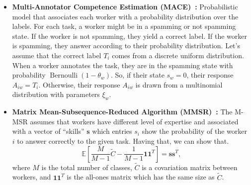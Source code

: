 \begin{itemize}
    \item \textbf{Multi-Annotator Competence Estimation (MACE)~\cite{hovy_MACE_2013}:}
    Probabilistic model that associates each worker with a probability distribution over the labels. For each task, a worker might be in a spamming or not spamming state. If the worker is not spamming, they yield a correct label. If the worker is spamming, they answer according to their probability distribution. Let's assume that the correct label $T_i$ comes from a discrete uniform distribution. When a worker annotates the task, they are in the spamming state with probability $\operatorname{Bernoulli}(1 - \theta_w)$. So, if their state $s_w = 0$, their response $A_{iw} = T_i$. Otherwise, their response $A_{iw}$ is drawn from a multinomial distribution with parameters $\xi_w$.
    \item \textbf{Matrix Mean-Subsequence-Reduced Algorithm (MMSR)~\cite{ma_Adversarial_2020}:} The M-MSR assumes that workers have different level of expertise and associated with a vector of ``skills'' $\boldsymbol{s}$ which entries $s_i$ show the probability of the worker $i$ to answer correctly to the given task. Having that, we can show that.
    \begin{equation}
        \mathbb{E}\left[\frac{M}{M-1}\widetilde{C}-\frac{1}{M-1}\boldsymbol{1}\boldsymbol{1}^T\right]
        = \boldsymbol{s}\boldsymbol{s}^T,
    \end{equation}
    where $M$ is the total number of classes, $\widetilde{C}$ is a covariation matrix between workers, and $\boldsymbol{1}\boldsymbol{1}^T$ is the all-ones matrix which has the same size as $\widetilde{C}$.


\end{itemize}

